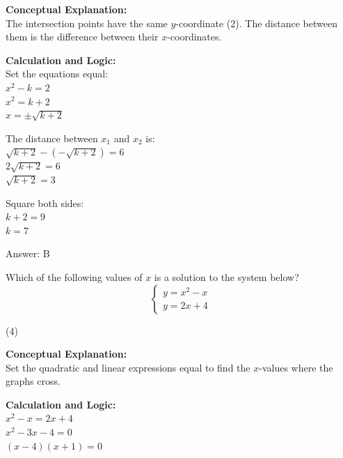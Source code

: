 \documentclass[11pt,paper=a4,answers]{exam}
\begin{document}
\begin{questions}
\begin{solution}
\textbf{Conceptual Explanation:} \\
The intersection points have the same $y$-coordinate (2). The distance between them is the difference between their $x$-coordinates.

\vspace{20pt}

\textbf{Calculation and Logic:} \\
Set the equations equal: \\
$x^2 - k = 2$ \\
$x^2 = k + 2$ \\
$x = \pm \sqrt{k + 2}$

\vspace{10pt}

The distance between $x_1$ and $x_2$ is: \\
$\sqrt{k + 2} - (-\sqrt{k + 2}) = 6$ \\
$2\sqrt{k + 2} = 6$ \\
$\sqrt{k + 2} = 3$

\vspace{10pt}

Square both sides: \\
$k + 2 = 9$ \\
$k = 7$

\vspace{25pt}

Answer: \colorbox{yellow!100}{B}
\end{solution}

\vspace{40pt}

\question
Which of the following values of $x$ is a solution to the system below?
\[ \begin{cases} y = x^2 - x \\ y = 2x + 4 \end{cases} \]
\begin{tasks}(4)
\end{tasks}

\begin{solution}
\textbf{Conceptual Explanation:} \\
Set the quadratic and linear expressions equal to find the $x$-values where the graphs cross.

\vspace{20pt}

\textbf{Calculation and Logic:} \\
$x^2 - x = 2x + 4$ \\
$x^2 - 3x - 4 = 0$ \\
$(x - 4)(x + 1) = 0$


\end{solution}
\end{questions}
\end{document}

